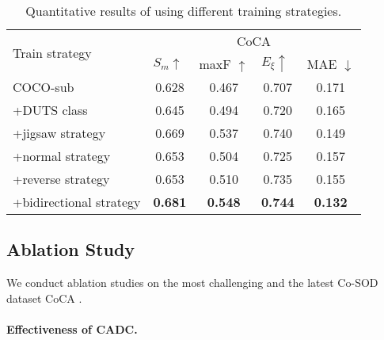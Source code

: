 \documentclass[10pt,twocolumn,letterpaper]{article}
\begin{document}
\begin{table}[]
\centering
\small
\caption{Quantitative results of using different training strategies.
}
\begin{tabular}{l|l|cccc}
\hline
\multicolumn{2}{l|}{\multirow{2}{*}{Train strategy}} & \multicolumn{4}{c}{CoCA} \\
\multicolumn{2}{l|}{}                      & \multicolumn{1}{l}{$S_m \uparrow$} & \multicolumn{1}{l}{maxF $\uparrow$} & \multicolumn{1}{l}{$E_\xi \uparrow$} & \multicolumn{1}{l}{MAE $\downarrow$}   \\ \hline

\multicolumn{2}{l|}{COCO-sub}    &0.628	&0.467 &0.707 &0.171   \\ \hline
\multicolumn{2}{l|}{+DUTS class \cite{zhang2020gicd}}  &0.645 &0.494 &0.720 &0.165 \\
\multicolumn{2}{l|}{+jigsaw strategy \cite{zhang2020gicd}}   &0.669	&0.537 &0.740 &0.149 \\ \hline
\multicolumn{2}{l|}{+normal strategy}                       &0.653 &0.504 &0.725 &0.157  \\
\multicolumn{2}{l|}{+reverse strategy}                      &0.653 &0.510 &0.735	&0.155\\
\multicolumn{2}{l|}{+bidirectional strategy}            &\textbf{0.681} &\textbf{0.548} &\textbf{0.744} &\textbf{0.132}\\ \hline
\end{tabular}
\label{strategy}
\end{table}


\subsection{Ablation Study}

We conduct ablation studies on the most challenging and the latest Co-SOD dataset CoCA \cite{zhang2020gicd}.

\paragraph{Effectiveness of CADC.}
\end{document}
